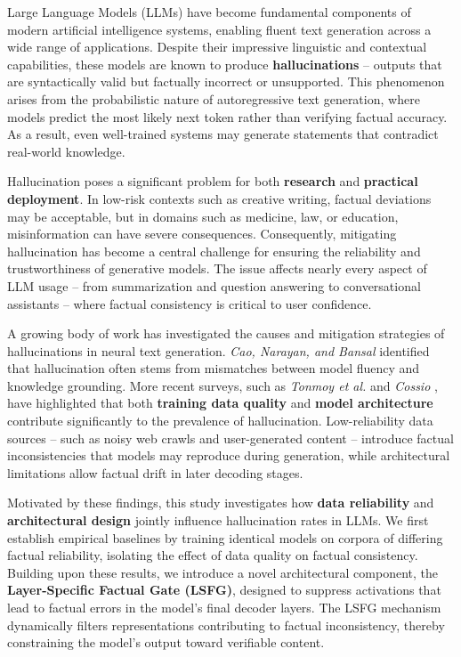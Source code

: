 Large Language Models (LLMs) have become fundamental components of modern artificial intelligence systems, enabling fluent text generation across a wide range of applications. Despite their impressive linguistic and contextual capabilities, these models are known to produce \textbf{hallucinations} -- outputs that are syntactically valid but factually incorrect or unsupported. This phenomenon arises from the probabilistic nature of autoregressive text generation, where models predict the most likely next token rather than verifying factual accuracy. As a result, even well-trained systems may generate statements that contradict real-world knowledge.

Hallucination poses a significant problem for both \textbf{research} and \textbf{practical deployment}. In low-risk contexts such as creative writing, factual deviations may be acceptable, but in domains such as medicine, law, or education, misinformation can have severe consequences. Consequently, mitigating hallucination has become a central challenge for ensuring the reliability and trustworthiness of generative models. The issue affects nearly every aspect of LLM usage -- from summarization and question answering to conversational assistants -- where factual consistency is critical to user confidence.

A growing body of work has investigated the causes and mitigation strategies of hallucinations in neural text generation. \textit{Cao, Narayan, and Bansal} \cite{cao2021hallucination} identified that hallucination often stems from mismatches between model fluency and knowledge grounding. More recent surveys, such as \textit{Tonmoy et al.} \cite{islam2024comprehensive} and \textit{Cossio} \cite{cossio2025comprehensive}, have highlighted that both \textbf{training data quality} and \textbf{model architecture} contribute significantly to the prevalence of hallucination. Low-reliability data sources -- such as noisy web crawls and user-generated content -- introduce factual inconsistencies that models may reproduce during generation, while architectural limitations allow factual drift in later decoding stages.

Motivated by these findings, this study investigates how \textbf{data reliability} and \textbf{architectural design} jointly influence hallucination rates in LLMs. We first establish empirical baselines by training identical models on corpora of differing factual reliability, isolating the effect of data quality on factual consistency. Building upon these results, we introduce a novel architectural component, the \textbf{Layer-Specific Factual Gate (LSFG)}, designed to suppress activations that lead to factual errors in the model’s final decoder layers. The LSFG mechanism dynamically filters representations contributing to factual inconsistency, thereby constraining the model’s output toward verifiable content.

